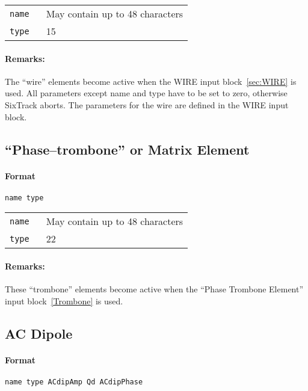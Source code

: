 \bigskip
\begin{tabular}{@{}lp{0.8\linewidth}}
    \texttt{name} & May contain up to 48 characters \\
    \texttt{type} & 15
\end{tabular}

\paragraph{Remarks:}
The ``wire'' elements become active when the WIRE input block~\ref{sec:WIRE} is used.
All parameters except name and type have to be set to zero, otherwise SixTrack aborts. The parameters for the wire are defined in the WIRE input block.

\subsection{``Phase--trombone'' or Matrix Element} \label{PT}

\paragraph{Format} \texttt{name type}

\bigskip
\begin{tabular}{@{}lp{0.8\linewidth}}
    \texttt{name} & May contain up to 48 characters \\
    \texttt{type} & 22
\end{tabular}

\paragraph{Remarks:}
These ``trombone'' elements become active when the ``Phase Trombone Element'' input block~\ref{Trombone} is used.

\subsection{AC Dipole} \label{ACDIP}

\paragraph{Format} \texttt{name type ACdipAmp Qd ACdipPhase}

